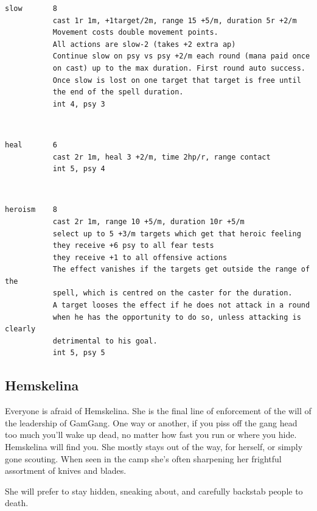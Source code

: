 \begin{samepage}
\begin{verbatim}
slow       8
           cast 1r 1m, +1target/2m, range 15 +5/m, duration 5r +2/m
           Movement costs double movement points.
           All actions are slow-2 (takes +2 extra ap)
           Continue slow on psy vs psy +2/m each round (mana paid once
           on cast) up to the max duration. First round auto success.
           Once slow is lost on one target that target is free until
           the end of the spell duration.
           int 4, psy 3
\end{verbatim} \end{samepage}   \   \goodbreak \begin{samepage} \begin{verbatim}
heal       6
           cast 2r 1m, heal 3 +2/m, time 2hp/r, range contact
           int 5, psy 4
\end{verbatim} \end{samepage}   \   \goodbreak \begin{samepage} \begin{verbatim}
heroism    8
           cast 2r 1m, range 10 +5/m, duration 10r +5/m
           select up to 5 +3/m targets which get that heroic feeling
           they receive +6 psy to all fear tests
           they receive +1 to all offensive actions
           The effect vanishes if the targets get outside the range of the
           spell, which is centred on the caster for the duration.
           A target looses the effect if he does not attack in a round
           when he has the opportunity to do so, unless attacking is clearly
           detrimental to his goal.
           int 5, psy 5
\end{verbatim} \end{samepage} \normalsize


\subsection*{Hemskelina}

Everyone is afraid of Hemskelina. She is the final line of enforcement of the will of the leadership of GamGang. One way or another, if you piss off the gang head too much you'll wake up dead, no matter how fast you run or where you hide. Hemskelina will find you.
She mostly stays out of the way, for herself, or simply gone scouting. When seen in the camp she's often sharpening her frightful assortment of knives and blades.

She will prefer to stay hidden, sneaking about, and carefully backstab people to death.

